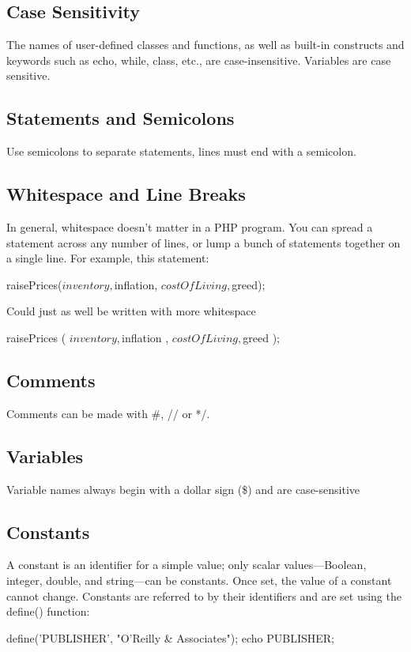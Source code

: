 \documentclass{report}
\begin{document}
    \pagebreak 
    \bigbreak \noindent 
    \subsection{Case Sensitivity}
    \bigbreak \noindent 
    The names of user-defined classes and functions, as well as built-in constructs and keywords such as echo, while, class, etc., are case-insensitive.
    \bigbreak \noindent 
    Variables are case sensitive.
    \bigbreak \noindent 
    \subsection{Statements and Semicolons}
    \bigbreak \noindent 
    Use semicolons to separate statements, lines must end with a semicolon.
    \bigbreak \noindent 
    \subsection{Whitespace and Line Breaks}
    \bigbreak \noindent 
    In general, whitespace doesn’t matter in a PHP program. You can spread a statement across any number of lines, or lump a bunch of statements together on a single line. For example, this statement:
    \bigbreak \noindent 
    \begin{phpcode}
    raisePrices($inventory, $inflation, $costOfLiving, $greed);
    \end{phpcode}
    \bigbreak \noindent 
    Could just as well be written with more whitespace
    \bigbreak \noindent 
    \begin{phpcode}
        raisePrices (
            $inventory ,
            $inflation ,
            $costOfLiving ,
            $greed
        );
    \end{phpcode}
    \bigbreak \noindent 
    \subsection{Comments}
    \bigbreak \noindent 
    Comments can be made with \#, // or \* */.

    \pagebreak 
    \subsection{Variables}
    \bigbreak \noindent 
    Variable names always begin with a dollar sign (\$) and are case-sensitive

    \bigbreak \noindent 
    \subsection{Constants}
    \bigbreak \noindent 
    A constant is an identifier for a simple value; only scalar values—Boolean, integer, double, and string—can be constants. Once set, the value of a constant cannot change. Constants are referred to by their identifiers and are set using the define() function:
    \bigbreak \noindent 
    \begin{phpcode}
    define('PUBLISHER', "O'Reilly & Associates");
    echo PUBLISHER;
    \end{phpcode}




    
\end{document}
